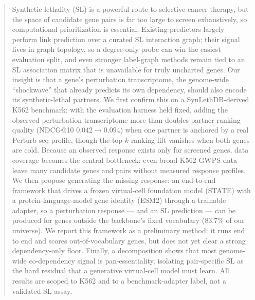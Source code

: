 \begin{abstract}
Synthetic lethality (SL) is a powerful route to selective cancer therapy, but the
space of candidate gene pairs is far too large to screen exhaustively, so
computational prioritization is essential. Existing predictors largely perform
link prediction over a curated SL interaction graph; their signal lives in graph
topology, so a degree-only probe can win the easiest evaluation split, and even
stronger label-graph methods remain tied to an SL association matrix that is
unavailable for truly uncharted genes. Our insight is that a gene's
perturbation transcriptome, the genome-wide ``shockwave'' that already predicts
its own dependency, should also encode its synthetic-lethal partners. We first
confirm this on a SynLethDB-derived K562 benchmark: with the evaluation harness
held fixed, adding the observed perturbation transcriptome more than doubles
partner-ranking quality (NDCG@10 $0.042\!\to\!0.094$) when one partner is anchored
by a real Perturb-seq profile, though the top-$k$ ranking lift vanishes when both
genes are cold. Because an observed response exists only for screened genes, data
coverage becomes the central bottleneck: even broad K562 GWPS data leave many
candidate genes and pairs without measured response profiles. We then propose
generating the missing response: an end-to-end framework that drives a frozen
virtual-cell foundation model (STATE) with a protein-language-model gene identity
(ESM2) through a trainable adapter, so a perturbation response --- and an SL
prediction --- can be produced for genes outside the backbone's fixed vocabulary
($83.7\%$ of our universe). We report this framework as a preliminary method: it
runs end to end and scores out-of-vocabulary genes, but does not yet clear a
strong dependency-only floor. Finally, a decomposition shows that most
genome-wide co-dependency signal is pan-essentiality, isolating pair-specific SL
as the hard residual that a generative virtual-cell model must learn. All results
are scoped to K562 and to a benchmark-adapter label, not a validated SL assay.
\end{abstract}
